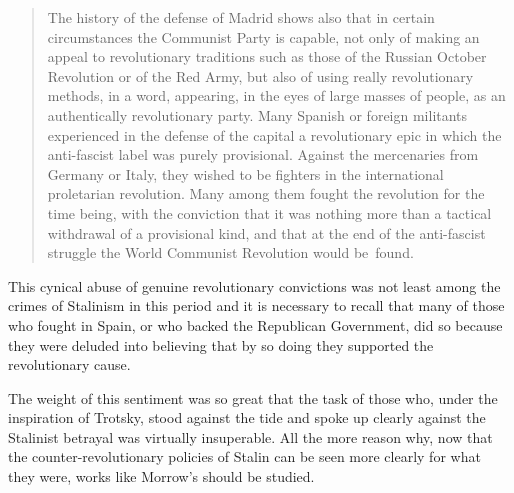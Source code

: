 \begin{quotation}
  \indexPCE{}
  The history of the defense of Madrid shows also that in certain circumstances the Communist Party is capable, not only of making an appeal to revolutionary traditions such as those of the Russian October Revolution or of the Red Army, but also of using really revolutionary methods, in a word, appearing, in the eyes of large masses of people, as an authentically revolutionary party. Many Spanish or foreign militants experienced in the defense of the capital a revolutionary epic in which the anti-fascist label was purely provisional. Against the mercenaries from Germany or Italy, they wished to be fighters in the international proletarian revolution. Many among them fought the revolution for the time being, with the conviction that it was nothing more than a tactical withdrawal of a provisional kind, and that at the end of the anti-fascist struggle the World Communist Revolution would be~found.
\end{quotation}

This cynical abuse of genuine revolutionary convictions was not least among the crimes of Stalinism in this period and it is necessary to recall that many of those who fought in Spain, or who backed the Republican Government, did so because they were deluded into believing that by so doing they supported the revolutionary cause.

The weight of this sentiment was so great that the task of those who, under the inspiration of Trotsky, stood against the tide and spoke up clearly against the Stalinist betrayal was virtually insuperable. All the more reason why, now that the  counter-revolutionary policies of Stalin can be seen more clearly for what they were, works like Morrow’s should be studied.

